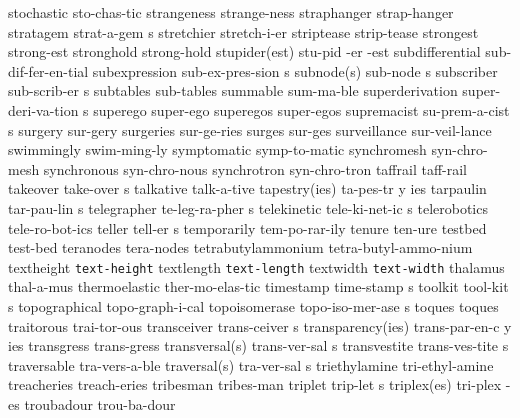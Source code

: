 \1 stochastic		sto-chas-tic
\1 strangeness		strange-ness
\1 straphanger		strap-hanger		%
\5 stratagem		strat-a-gem s
\1 stretchier		stretch-i-er
\1 striptease		strip-tease		%
\1 strongest		strong-est
\1 stronghold		strong-hold
\3 stupider(est)	stu-pid -er -est
\1 subdifferential	sub-dif-fer-en-tial	%
\5 subexpression	sub-ex-pres-sion s	%
\2 subnode(s)		sub-node s		%
\5 subscriber 		sub-scrib-er s
\1 subtables		sub-tables		%
\1 summable		sum-ma-ble
\5 superderivation	super-deri-va-tion s	%
\1 superego		super-ego
\1 superegos		super-egos
\5 supremacist		su-prem-a-cist s
\1 surgery		sur-gery		%
\1 surgeries		sur-ge-ries		%
\1 surges		sur-ges 		%
\1 surveillance		sur-veil-lance
\1 swimmingly		swim-ming-ly
\1 symptomatic		symp-to-matic
\1 synchromesh		syn-chro-mesh
\1 synchronous		syn-chro-nous
\1 synchrotron		syn-chro-tron
\1 taffrail		taff-rail		%
\5 takeover		take-over s		%
\1 talkative		talk-a-tive
\3 tapestry(ies)	ta-pes-tr y ies
\5 tarpaulin		tar-pau-lin s
\5 telegrapher		te-leg-ra-pher s
\5 telekinetic		tele-ki-net-ic s
\1 telerobotics		tele-ro-bot-ics
\5 teller		tell-er s		%
\1 temporarily		tem-po-rar-ily		%
\1 tenure		ten-ure
\1 testbed		test-bed
\NewWordtrue
\1 teranodes		tera-nodes		%
\1 tetrabutylammonium	tetra-butyl-ammo-nium	%
\1 textheight		{\tt\bs text-height}	%
\1 textlength		{\tt\bs text-length}	%
\1 textwidth		{\tt\bs text-width}
\1 thalamus		thal-a-mus
\1 thermoelastic	ther-mo-elas-tic
\5 timestamp		time-stamp s
\5 toolkit		tool-kit s
\1 topographical	topo-graph-i-cal
\5 topoisomerase	topo-iso-mer-ase s	%
\1 toques		toques
\1 traitorous		trai-tor-ous
\5 transceiver		trans-ceiver s
\3 transparency(ies)	trans-par-en-c y ies	%
\1 transgress		trans-gress
\2 transversal(s)	trans-ver-sal s
\5 transvestite		trans-ves-tite s
\1 traversable		tra-vers-a-ble
\2 traversal(s)		tra-ver-sal s
\1 triethylamine	tri-ethyl-amine		%
\1 treacheries		treach-eries
\1 tribesman		tribes-man		%
\5 triplet		trip-let s		%
\NewWordtrue
\2 triplex(es)		tri-plex -es		%
\1 troubadour		trou-ba-dour
